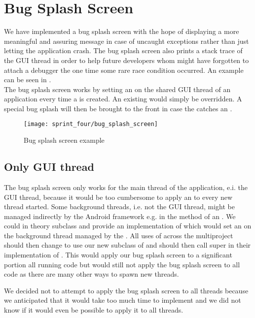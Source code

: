 
\section{Bug Splash Screen}
\label{sec:bug_splash_screen}


We have implemented a bug splash screen with the hope of displaying a more meaningful and assuring message in case of uncaught exceptions rather than just letting the application crash. The bug splash screen also prints a stack trace of the GUI thread in order to help future developers whom might have forgotten to attach a debugger the one time some rare race condition occurred. An example can be seen in .\\

The bug splash screen works by setting an  on the shared GUI thread of an application every time a  is created. An existing  would simply be overridden. A special bug splash  will then be brought to the front in case the  catches an .

\begin{figure}[!htbp]
        \centering
        \texttt{[image: sprint\_four/bug\_splash\_screen]}
        \caption{Bug splash screen example}
        \label{fig:bug_splash_screen_example}
\end{figure}

\subsection{Only GUI thread} 
The bug splash screen only works for the main thread of the application, e.i. the GUI thread, because it would be too cumbersome to apply an  to every new thread started. Some background threads, i.e. not the GUI thread, might be managed indirectly by the Android framework e.g. in the  method of an . We could in theory subclass  and provide an implementation of  which would set an  on the background thread managed by the . All uses of  across the \giraf multiproject should then change to use our new subclass of  and should then call super in their implementation of . This would apply our bug splash screen to a significant portion all running code but would still not apply the bug splash screen to all code as there are many other ways to spawn new threads. 

We decided not to attempt to apply the bug splash screen to all threads because we anticipated that it would take too much time to implement and we did not know if it would even be possible to apply it to all threads.          
